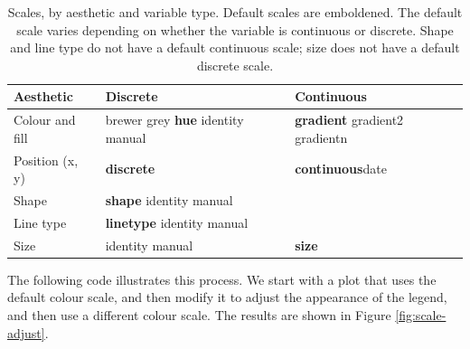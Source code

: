 \begin{table}
  \begin{center}
  \begin{tabular}{p{1in}p{1in}p{1in}}
    \toprule
    Aesthetic & Discrete & Continuous \\
    \midrule
    Colour and fill & brewer \newline grey \newline \textbf{hue} \newline identity \newline manual & \textbf{gradient} \newline gradient2 \newline gradientn \\[0.5em]
    Position (x, y) & \textbf{discrete} & \textbf{continuous}\newline date \\[0.5em]
    Shape & \textbf{shape} \newline identity \newline manual  \\[0.5em]
    Line type & \textbf{linetype} \newline identity \newline manual \\[0.5em]
    Size & identity \newline manual & \textbf{size} \\
    \bottomrule
  \end{tabular}
  \end{center}
  \caption{Scales, by aesthetic and variable type.  Default scales are emboldened. The default scale varies depending on whether the variable is continuous or discrete.  Shape and line type do not have a default continuous scale; size does not have a default discrete scale.}
  \label{tbl:default-scales}
\end{table}

The following code illustrates this process. We start with a plot that
uses the default colour scale, and then modify it to adjust the
appearance of the legend, and then use a different colour scale. The
results are shown in Figure \ref{fig:scale-adjust}.

